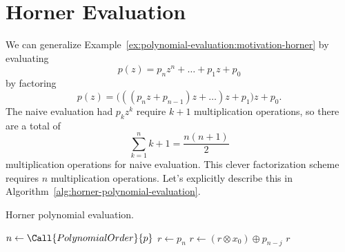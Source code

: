 \section{Horner Evaluation}

We can generalize Example~\ref{ex:polynomial-evaluation:motivation-horner}
by evaluating
\begin{equation}
  p(z) = p_{n}z^{n} + \dots + p_{1}z + p_{0}
\end{equation}
by factoring
\begin{equation}
  p(z) = \bigl(((p_{n}z + p_{n-1})z + \dots)z + p_{1}\bigr)z + p_{0}.
\end{equation}
The naive evaluation had $p_{k}z^{k}$ require $k+1$ multiplication
operations, so there are a total of
\begin{equation}
  \sum^{n}_{k=1}k+1 = \frac{n(n+1)}{2}
\end{equation}
multiplication operations for naive evaluation. This clever
factorization scheme requires $n$ multiplication operations.
Let's explicitly describe this in Algorithm~\ref{alg:horner-polynomial-evaluation}.

\begin{algorithm}\label{alg:horner-polynomial-evaluation}
  \caption{Horner polynomial evaluation.}
  \begin{algorithmic}[1]
     
      \State$n\gets\Call{PolynomialOrder}{p}$
      \State$r\gets p_{n}$
        \State\label{step:horner-polynomial-evaluation:loop-body}$r\gets (r\otimes x_{0}) \oplus p_{n-j}$
      \EndFor
      \State \Return $r$
    \EndFunction
\end{algorithmic}
\end{algorithm}

